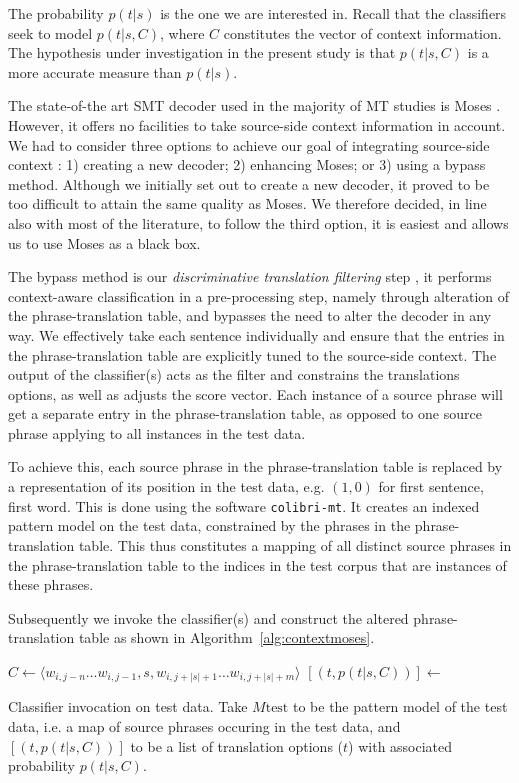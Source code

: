 \documentclass[smallextended]{svjour3}       %
\theoremstyle{break}
\begin{document}
The probability $p(t|s)$ is the one we are interested in. Recall that the
classifiers seek to model $p(t|s,C)$, where $C$ constitutes the vector of
context information. The hypothesis under investigation in the present study is
that $p(t|s,C)$ is a more accurate measure than $p(t|s)$.

The state-of-the art SMT decoder used in the majority of MT studies is Moses
\citep{MOSES}. However, it offers no facilities to take source-side context
information in account. We had to consider three options to achieve our goal of
integrating source-side context : 1) creating a new decoder; 2) enhancing
Moses; or 3) using a bypass method. Although we initially set out to create a
new decoder, it proved to be too difficult to attain the same quality as Moses.
We therefore decided, in line also with most of the literature, to follow the
third option, it is easiest and allows us to use Moses as a black box.

The bypass method is our \emph{discriminative translation filtering}
step \citep{Rejwanul+11}, it performs context-aware classification in a
pre-processing step, namely through alteration of the phrase-translation table,
and bypasses the need to alter the decoder in any way. We effectively take each
sentence individually and ensure that the entries in the phrase-translation
table are explicitly tuned to the source-side context. The output of the
classifier(s) acts as the filter and constrains the translations options, as
well as adjusts the score vector. Each instance of a source phrase will get a
separate entry in the phrase-translation table, as opposed to one source phrase
applying to all instances in the test data. 

To achieve this, each source phrase in the phrase-translation table is replaced
by a representation of its position in the test data, e.g.  $(1,0)$ for first
sentence, first word.  This is done using the software \texttt{colibri-mt}. It
creates an indexed pattern model on the test data, constrained by the phrases
in the phrase-translation table. This thus constitutes a mapping of all distinct
source phrases in the phrase-translation table to the indices in the test
corpus that are instances of these phrases.

Subsequently we invoke the classifier(s) and construct the altered
phrase-translation table as shown in Algorithm~\ref{alg:contextmoses}.

\begin{algorithm}
\begin{algorithmic}
    \State $C \gets \langle w_{i,j-n} \ldots w_{i,j-1}, s, w_{i,j+|s|+1} \ldots w_{i,j+|s|+m} \rangle$
    \State $[(t, p(t|s,C) )] \gets$ 
  \EndFor
\EndFor
\end{algorithmic}
\caption{Classifier invocation on test data. Take $M{\text{test}}$ to be the pattern
model of the test data, i.e. a map of source phrases occuring in the test
data, and $[(t,p(t|s,C))]$ to be a list of translation options ($t$) with
associated probability $p(t|s,C)$.}
\label{alg:contextmoses}
\end{algorithm}
\end{document}
